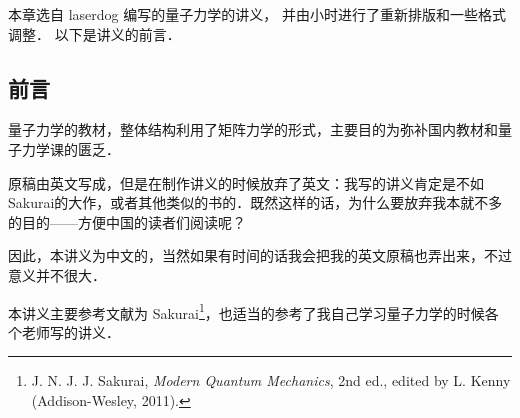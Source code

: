 
本章选自 laserdog 编写的量子力学的讲义，%
并由小时进行了重新排版和一些格式调整． 以下是讲义的前言．

\subsection{前言}

量子力学的教材，整体结构利用了矩阵力学的形式，主要目的为弥补国内教材和量子力学课的匮乏．

原稿由英文写成，但是在制作讲义的时候放弃了英文：我写的讲义肯定是不如Sakurai的大作，或者其他类似的书的．既然这样的话，为什么要放弃我本就不多的目的——方便中国的读者们阅读呢？

因此，本讲义为中文的，当然如果有时间的话我会把我的英文原稿也弄出来，不过意义并不很大．

本讲义主要参考文献为 Sakurai\footnote{J. N. J. J. Sakurai, \textsl{Modern Quantum Mechanics}, 2nd ed., edited by L. Kenny (Addison-Wesley, 2011).}，也适当的参考了我自己学习量子力学的时候各个老师写的讲义．
